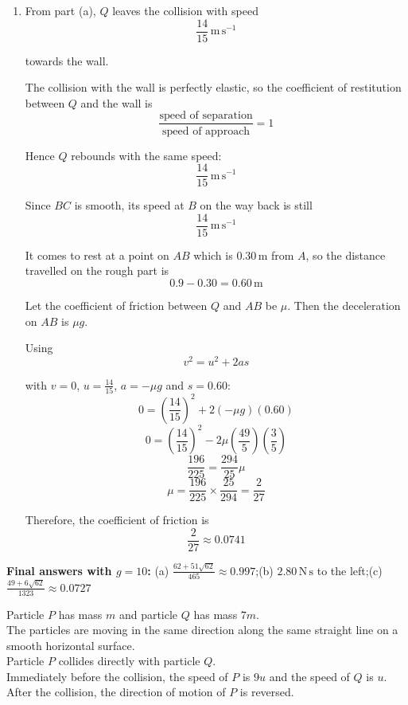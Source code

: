 \documentclass[leqno]{article}
\begin{document}
\begin{enumerate}[
  label=\textbf{\arabic*.},
  leftmargin=*,
  topsep=0pt,
  partopsep=0pt,
  parsep=0pt
]
\begin{djsSolution}
\begin{enumerate}[label=\textbf{(\alph*)}]
  \item From part (a), $Q$ leaves the collision with speed
  \[
  \frac{14}{15}\,\mathrm{m\,s^{-1}}
  \]

  towards the wall.

  The collision with the wall is perfectly elastic, so the coefficient of restitution between $Q$ and the wall is
  \[
  \frac{\text{speed of separation}}{\text{speed of approach}}=1
  \]

  Hence $Q$ rebounds with the same speed:
  \[
  \frac{14}{15}\,\mathrm{m\,s^{-1}}
  \]

  Since $BC$ is smooth, its speed at $B$ on the way back is still
  \[
  \frac{14}{15}\,\mathrm{m\,s^{-1}}
  \]

  It comes to rest at a point on $AB$ which is $0.30\,\mathrm{m}$ from $A$, so the distance travelled on the rough part is
  \[
  0.9-0.30=0.60\,\mathrm{m}
  \]

  Let the coefficient of friction between $Q$ and $AB$ be $\mu$.
  Then the deceleration on $AB$ is $\mu g$.

  Using
  \[
  v^2=u^2+2as
  \]

  with $v=0$, $u=\frac{14}{15}$, $a=-\mu g$ and $s=0.60$:
  \[
  0=\left(\frac{14}{15}\right)^2+2(-\mu g)(0.60)
  \]
  \[
  0=\left(\frac{14}{15}\right)^2-2\mu\left(\frac{49}{5}\right)\left(\frac{3}{5}\right)
  \]
  \[
  \frac{196}{225}=\frac{294}{25}\mu
  \]
  \[
  \mu=\frac{196}{225}\times\frac{25}{294}
  =\frac{2}{27}
  \]

  Therefore, the coefficient of friction is
  \[
  \frac{2}{27}\approx 0.0741
  \]
\end{enumerate}
\par\medskip\noindent\textbf{Final answers with \(g = 10\):} (a) \(\frac{62+51\sqrt{62}}{465}\approx 0.997\);\quad (b) \(2.80\,\mathrm{N\,s}\) to the left;\quad (c) \(\frac{49+6\sqrt{62}}{1323}\approx 0.0727\)
\end{djsSolution}


\newpage

\questionitem

Particle $P$ has mass $m$ and particle $Q$ has mass $7m$. \\

The particles are moving in the same direction along the same straight line on a smooth horizontal surface. \\
Particle $P$ collides directly with particle $Q$. \\
Immediately before the collision, the speed of $P$ is $9u$ and the speed of $Q$ is $u$. \\
After the collision, the direction of motion of $P$ is reversed. \\


\end{enumerate}
\end{document}
